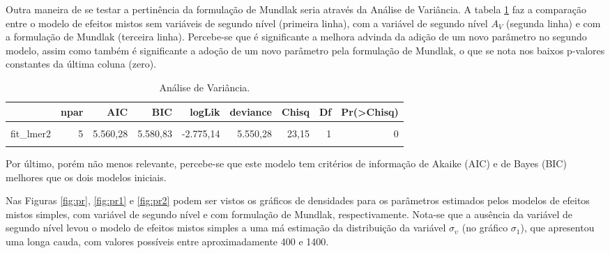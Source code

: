 \documentclass[
  a4paper, 11pt]{article}
\begin{document}
Outra maneira de se testar a pertinência da formulação de Mundlak seria
através da Análise de Variância. A tabela \ref{tab:anova} faz a
comparação entre o modelo de efeitos mistos sem variáveis de segundo
nível (primeira linha), com a variável de segundo nível \(A_V\) (segunda
linha) e com a formulação de Mundlak (terceira linha). Percebe-se que é
significante a melhora advinda da adição de um novo parâmetro no segundo
modelo, assim como também é significante a adoção de um novo parâmetro
pela formulação de Mundlak, o que se nota nos baixos p-valores
constantes da última coluna (zero).

\begin{table}

\caption{\label{tab:anova}Análise de Variância.}
\centering
\begin{tabular}[t]{lrrrrrrrr}
\toprule
  & npar & AIC & BIC & logLik & deviance & Chisq & Df & Pr(>Chisq)\\
\midrule
\cellcolor{gray!6}{fit\_lmer} & \cellcolor{gray!6}{4} & \cellcolor{gray!6}{5.581,43} & \cellcolor{gray!6}{5.597,86} & \cellcolor{gray!6}{-2.786,71} & \cellcolor{gray!6}{5.573,43} & \cellcolor{gray!6}{NA} & \cellcolor{gray!6}{NA} & \cellcolor{gray!6}{NA}\\
fit\_lmer2 & 5 & 5.560,28 & 5.580,83 & -2.775,14 & 5.550,28 & 23,15 & 1 & 0\\
\cellcolor{gray!6}{mundlak} & \cellcolor{gray!6}{6} & \cellcolor{gray!6}{5.547,46} & \cellcolor{gray!6}{5.572,12} & \cellcolor{gray!6}{-2.767,73} & \cellcolor{gray!6}{5.535,46} & \cellcolor{gray!6}{14,82} & \cellcolor{gray!6}{1} & \cellcolor{gray!6}{0}\\
\bottomrule
\end{tabular}
\end{table}

Por último, porém não menos relevante, percebe-se que este modelo tem
critérios de informação de Akaike (AIC) e de Bayes (BIC) melhores que os
dois modelos iniciais.

Nas Figuras \ref{fig:pr}, \ref{fig:pr1} e \ref{fig:pr2} podem ser vistos
os gráficos de densidades para os parâmetros estimados pelos modelos de
efeitos mistos simples, com variável de segundo nível e com formulação
de Mundlak, respectivamente. Nota-se que a ausência da variável de
segundo nível levou o modelo de efeitos mistos simples a uma má
estimação da distribuição da variável \(\sigma_\upsilon\) (no gráfico
\(\sigma_1\)), que apresentou uma longa cauda, com valores possíveis
entre aproximadamente 400 e 1400.
\end{document}
